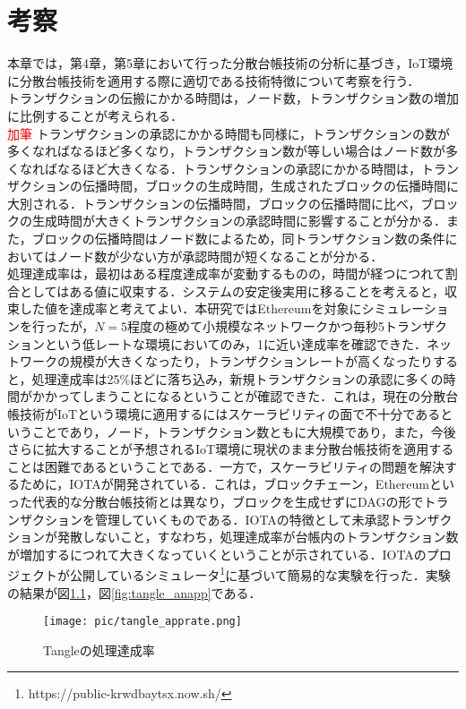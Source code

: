 \documentclass[japanese, macos]{KU2}
\begin{document}
\chapter{考察}
本章では，第4章，第5章において行った分散台帳技術の分析に基づき，IoT環境に分散台帳技術を適用する際に適切である技術特徴について考察を行う．\\
トランザクションの伝搬にかかる時間は，ノード数，トランザクション数の増加に比例することが考えられる．\\
\textcolor{red}{加筆}
トランザクションの承認にかかる時間も同様に，トランザクションの数が多くなればなるほど多くなり，トランザクション数が等しい場合はノード数が多くなればなるほど大きくなる．トランザクションの承認にかかる時間は，トランザクションの伝播時間，ブロックの生成時間，生成されたブロックの伝播時間に大別される．トランザクションの伝播時間，ブロックの伝播時間に比べ，ブロックの生成時間が大きくトランザクションの承認時間に影響することが分かる．また，ブロックの伝播時間はノード数によるため，同トランザクション数の条件においてはノード数が少ない方が承認時間が短くなることが分かる．\\
処理達成率は，最初はある程度達成率が変動するものの，時間が経つにつれて割合としてはある値に収束する．システムの安定後実用に移ることを考えると，収束した値を達成率と考えてよい．本研究ではEthereumを対象にシミュレーションを行ったが，$N=5$程度の極めて小規模なネットワークかつ毎秒5トランザクションという低レートな環境においてのみ，1に近い達成率を確認できた．ネットワークの規模が大きくなったり，トランザクションレートが高くなったりすると，処理達成率は25\%ほどに落ち込み，新規トランザクションの承認に多くの時間がかかってしまうことになるということが確認できた．これは，現在の分散台帳技術がIoTという環境に適用するにはスケーラビリティの面で不十分であるということであり，ノード，トランザクション数ともに大規模であり，また，今後さらに拡大することが予想されるIoT環境に現状のまま分散台帳技術を適用することは困難であるということである．一方で，スケーラビリティの問題を解決するために，IOTAが開発されている．これは，ブロックチェーン，Ethereumといった代表的な分散台帳技術とは異なり，ブロックを生成せずにDAGの形でトランザクションを管理していくものである．IOTAの特徴として未承認トランザクションが発散しないこと，すなわち，処理達成率が台帳内のトランザクション数が増加するにつれて大きくなっていくということが示されている．IOTAのプロジェクトが公開しているシミュレータ\footnote{https://public-krwdbaytsx.now.sh/}に基づいて簡易的な実験を行った．実験の結果が図\ref{fig:tangle_apprate}，図\ref{fig:tangle_anapp}である．

\begin{figure}
  \begin{center}
   \texttt{[image: pic/tangle\_apprate.png]}
  \end{center}
  \caption{Tangleの処理達成率}
  \label{fig:tangle_apprate}
\end{figure}
\end{document}
